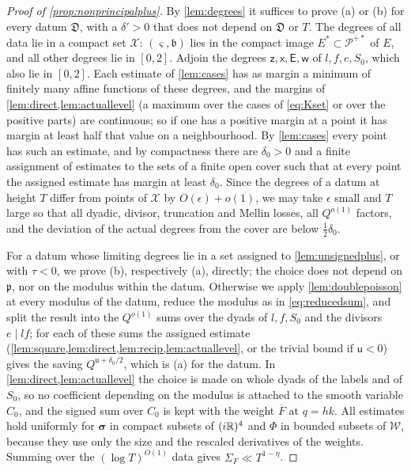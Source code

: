 \documentclass[11pt,colorlinks]{charlie}
\begin{document}
\begin{proof}[Proof of \cref{prop:nonprincipalplus}]
By \cref{lem:degrees} it suffices to prove (a) or (b) for every datum $\mathfrak D$, with a $\delta'>0$ that does not depend on $\mathfrak D$ or $T$. The degrees of all data lie in a compact set $\mathcal X$: $(\varsigma,\mathfrak b)$ lies in the compact image $E^*\subset\mathcal P^{+*}$ of $E$, and all other degrees lie in $[0,2]$. Adjoin the degrees $\mathsf z,\mathsf x,\mathsf E,\mathsf w$ of $l,f,e,S_0$, which also lie in $[0,2]$. Each estimate of \cref{lem:cases} has as margin a minimum of finitely many affine functions of these degrees, and the margins of \cref{lem:direct,lem:actuallevel} (a maximum over the cases of \eqref{eq:Kset} or over the positive parts) are continuous; so if one has a positive margin at a point it has margin at least half that value on a neighbourhood. By \cref{lem:cases} every point has such an estimate, and by compactness there are $\delta_0>0$ and a finite assignment of estimates to the sets of a finite open cover such that at every point the assigned estimate has margin at least $\delta_0$. Since the degrees of a datum at height $T$ differ from points of $\mathcal X$ by $O(\epsilon)+o(1)$, we may take $\epsilon$ small and $T$ large so that all dyadic, divisor, truncation and Mellin losses, all $Q^{o(1)}$ factors, and the deviation of the actual degrees from the cover are below $\frac12\delta_0$.

For a datum whose limiting degrees lie in a set assigned to \cref{lem:unsignedplus}, or with $\tau<0$, we prove (b), respectively (a), directly; the choice does not depend on $\mathfrak p$, nor on the modulus within the datum. Otherwise we apply \cref{lem:doublepoisson} at every modulus of the datum, reduce the modulus as in \eqref{eq:reducedsum}, and split the result into the $Q^{o(1)}$ sums over the dyads of $l,f,S_0$ and the divisors $e\mid lf$; for each of these sums the assigned estimate (\cref{lem:square,lem:direct,lem:recip,lem:actuallevel}, or the trivial bound if $\mathsf u<0$) gives the saving $Q^{\mathsf u+\delta_0/2}$, which is (a) for the datum. In \cref{lem:direct,lem:actuallevel} the choice is made on whole dyads of the labels and of $S_0$, so no coefficient depending on the modulus is attached to the smooth variable $C_0$, and the signed sum over $C_0$ is kept with the weight $\overline F$ at $q=hk$. All estimates hold uniformly for $\boldsymbol\sigma$ in compact subsets of $(i\mathbb{R})^4$ and $\Phi$ in bounded subsets of $\mathcal W$, because they use only the size and the rescaled derivatives of the weights. Summing over the $(\log T)^{O(1)}$ data gives $\Sigma_F\ll T^{1-\eta}$.
\end{proof}
\end{document}
